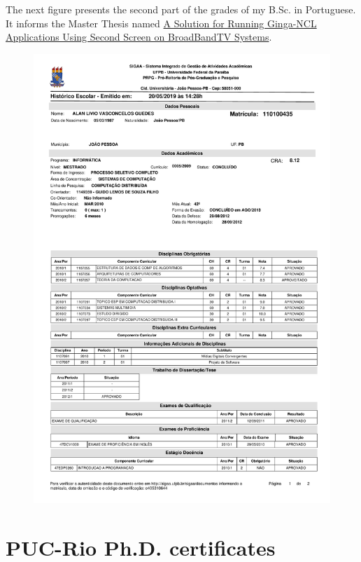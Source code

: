 \documentclass[10pt,a4paper,sans,colorlinks]{moderncv}
\begin{document}
\newpage
The next figure presents the second part of the grades of my B.Sc. in Portuguese.
It informs the Master Thesis named \href{https://repositorio.ufpb.br/jspui/handle/tede/6087}{A Solution for Running Ginga-NCL Applications Using Second Screen on BroadBandTV Systems}.
\vspace{1em}
\begin{figure}
    \centering
    \includegraphics[align=t,width=\textwidth,height=0.6\paperheight, keepaspectratio=true, page=2, trim=0cm 0cm 0cm 2cm]{certificates/msc-grades.pdf}
\end{figure}


\newpage
\section{PUC-Rio Ph.D. certificates}
\end{document}
